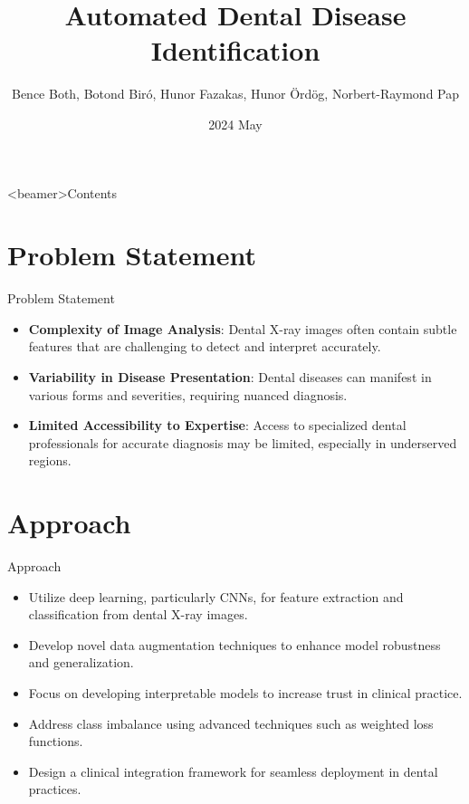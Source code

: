 \documentclass{beamer}
\title[Automated Dental Disease
Identification]{Automated Dental Disease
Identification}
\author{ Bence Both, Botond Biró, Hunor Fazakas, Hunor Ördög, Norbert-Raymond Pap}
\institute[UBB Cluj-Napoca]{
  Department of Mathematics and Informatics\\
  Babe{\c{s}}--Bolyai University, Cluj-Napoca}
\date{2024 May}
\begin{document}
\frame{\maketitle}

{

  {
      \begin{frame}<beamer>{Contents}
        \tableofcontents
      \end{frame}
    }
}

\section[Problem Statement]{Problem Statement}

\begin{frame}{Problem Statement}
  \begin{itemize}
    \item \textbf{Complexity of Image Analysis}: Dental X-ray images often contain subtle features
          that are challenging to detect and interpret accurately.
    \item \textbf{Variability in Disease Presentation}: Dental diseases can manifest in various forms and severities,
          requiring nuanced diagnosis.
    \item \textbf{Limited Accessibility to Expertise}: Access to specialized dental professionals for
          accurate diagnosis may be limited, especially in underserved regions.
  \end{itemize}
\end{frame}

\section[Approach]{Approach}

\begin{frame}{Approach}
  \begin{itemize}
    \item Utilize deep learning, particularly CNNs, for feature extraction and classification from dental X-ray images.\cite{chen2021dental}
    \item Develop novel data augmentation techniques to enhance model robustness and generalization.\cite{lee2018detection}
    \item Focus on developing interpretable models to increase trust in clinical practice.\cite{setiabudi2017expert}
    \item Address class imbalance using advanced techniques such as weighted loss functions.\cite{litjens2017survey}
    \item Design a clinical integration framework for seamless deployment in dental practices.
  \end{itemize}
\end{frame}
\end{document}

